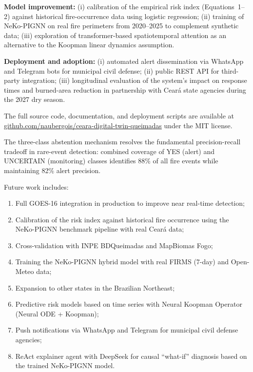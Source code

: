 \documentclass[preprint,times,numbers]{elsarticle}
\begin{document}
\textbf{Model improvement:} (i) calibration of the empirical risk index (Equations~1--2) against historical fire-occurrence data using logistic regression; (ii) training of NeKo-PIGNN on real fire perimeters from 2020--2025 to complement synthetic data; (iii) exploration of transformer-based spatiotemporal attention as an alternative to the Koopman linear dynamics assumption.

\textbf{Deployment and adoption:} (i) automated alert dissemination via WhatsApp and Telegram bots for municipal civil defense; (ii) public REST API for third-party integration; (iii) longitudinal evaluation of the system's impact on response times and burned-area reduction in partnership with Cear\'a state agencies during the 2027 dry season.

The full source code, documentation, and deployment scripts are available at \href{https://github.com/naubergois/ceara-digital-twin-queimadas}{github.com/naubergois/ceara-digital-twin-queimadas} under the MIT license.

The three-class abstention mechanism resolves the fundamental precision-recall tradeoff in rare-event detection: combined coverage of YES (alert) and UNCERTAIN (monitoring) classes identifies 88\% of all fire events while maintaining 82\% alert precision.

Future work includes:

\begin{enumerate}
    \item Full GOES-16 integration in production to improve near real-time detection;
    \item Calibration of the risk index against historical fire occurrence using the NeKo-PIGNN benchmark pipeline with real Cear\'{a} data;
    \item Cross-validation with INPE BDQueimadas and MapBiomas Fogo;
    \item Training the NeKo-PIGNN hybrid model with real FIRMS (7-day) and Open-Meteo data;
    \item Expansion to other states in the Brazilian Northeast;
    \item Predictive risk models based on time series with Neural Koopman Operator (Neural ODE + Koopman);
    \item Push notifications via WhatsApp and Telegram for municipal civil defense agencies;
    \item ReAct explainer agent with DeepSeek for causal ``what-if'' diagnosis based on the trained NeKo-PIGNN model.
\end{enumerate}
\end{document}
